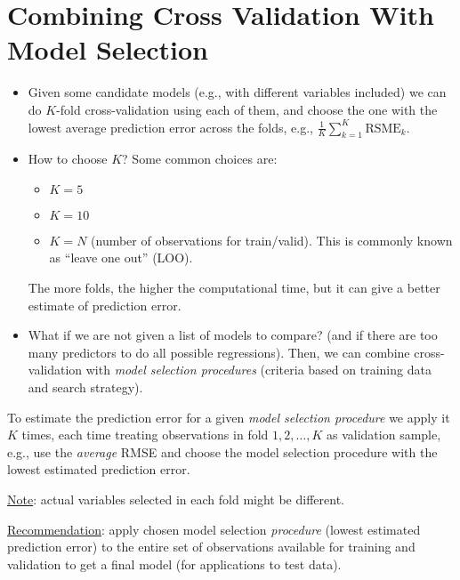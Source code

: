 \section{Combining Cross Validation With Model Selection}
\begin{itemize}
      \item Given some candidate models (e.g., with different
            variables included) we can do $ K $-fold
            cross-validation using each of them, and choose the one
            with the lowest average prediction error across
            the folds, e.g., $ \displaystyle
                  \frac{1}{K} \sum_{k=1}^{K} \text{RSME}_k $.
      \item How to choose $ K $? Some common choices are:
            \begin{itemize}
                  \item $ K=5 $
                  \item $ K=10 $
                  \item $ K=N $ (number of observations for train/valid).
                        This is commonly known as ``leave one out'' (LOO).
            \end{itemize}
            The more folds, the higher the computational time, but
            it can give a better estimate of prediction error.
      \item What if we are not given a list of models to compare?
            (and if there are too many predictors to do all possible
            regressions). Then, we can combine cross-validation with
            \emph{model selection procedures} (criteria based on training
            data and search strategy).
\end{itemize}
To estimate the prediction error for a given
\emph{model selection procedure} we apply it $ K $ times,
each time treating observations in fold $ 1,2,\ldots,K $
as validation sample, e.g., use the \emph{average}
RMSE and choose the model selection procedure
with the lowest estimated prediction error.

\underline{Note}: actual variables selected in each fold might
be different.

\underline{Recommendation}: apply chosen
model selection \emph{procedure} (lowest estimated prediction error)
to the entire set of observations available for training
and validation to get a final model (for applications
to test data).

